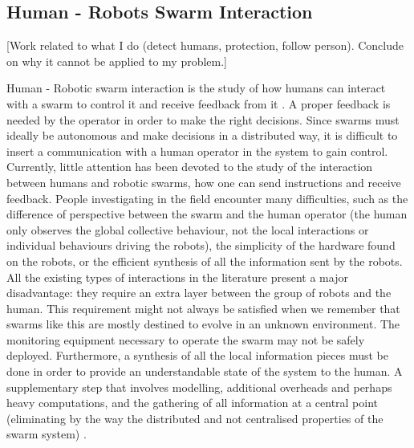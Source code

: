 \documentclass[oneside, a4paper, 12pt]{memoir}
\begin{document}
	\subsection{Human - Robots Swarm Interaction}
	
	[Work related to what I do (detect humans, protection, follow person). Conclude on why it cannot be applied to my problem.]
	
	Human - Robotic swarm interaction is the study of how humans can interact with a swarm to control it and receive feedback from it \citep{brambilla2013swarm}. A proper feedback is needed by the operator in order to make the right decisions. Since swarms must ideally be autonomous and make decisions in a distributed way, it is difficult to insert a communication with a human operator in the system to gain control.\\
	
	Currently, little attention has been devoted to the study of the interaction between humans and robotic swarms, how one can send instructions and receive feedback. People investigating in the field encounter many difficulties, such as the difference of perspective between the swarm and the human operator (the human only observes the global collective behaviour, not the local interactions or individual behaviours driving the robots), the simplicity of the hardware found on the robots, or the efficient synthesis of all the information sent by the robots. All the existing types of interactions in the literature present a major disadvantage: they require an extra layer between the group of robots and the human. This requirement might not always be satisfied when we remember that swarms like this are mostly destined to evolve in an unknown environment. The monitoring equipment necessary to operate the swarm may not be safely deployed. Furthermore, a synthesis of all the local information pieces must be done in order to provide an understandable state of the system to the human. A supplementary step that involves modelling, additional overheads and perhaps heavy computations, and the gathering of all information at a central point (eliminating by the way the distributed and not centralised properties of the swarm system) \citep{podevijn2012self}.\\
	
\end{document}
